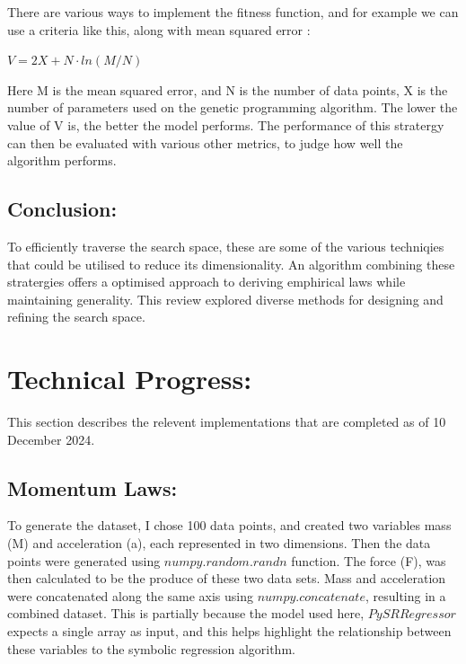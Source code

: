 \documentclass{article}
\begin{document}
There are various ways to implement the fitness function, and for example we can use a criteria like this, along with mean squared error \cite{Liddle2009}:\\

\begin{center}
  $V = 2X + N \cdot ln(M/N) $
\end{center}

Here M is the mean squared error, and N is the number of data points, X is the number of parameters used on the genetic programming algorithm. The lower the value of V is, the better the model performs. The performance of this stratergy can then be evaluated with various other metrics, to judge how well the algorithm performs. \\ 











\subsection{ Conclusion: }

To efficiently traverse the search space, these are some of the various techniqies that could be utilised to reduce its dimensionality. An algorithm combining these stratergies offers a optimised approach to deriving emphirical laws while maintaining generality. This review explored diverse methods for designing and refining the search space. \\   




\section{Technical Progress: }

This section describes the relevent implementations that are completed as of 10 December 2024.\\ 

\subsection{Momentum Laws: }

To generate the dataset, I chose 100 data points, and created two variables mass (M) and acceleration (a), each represented in two dimensions. Then the data points were generated using $numpy.random.randn$ function. The force (F), was then calculated to be the produce of these two data sets. Mass and acceleration were concatenated along the same axis using $numpy.concatenate$, resulting in a combined dataset. This is partially because the model used here, $PySRRegressor$ expects a single array as input, and this helps highlight the relationship between these variables to the symbolic regression algorithm.\\ 
\end{document}
